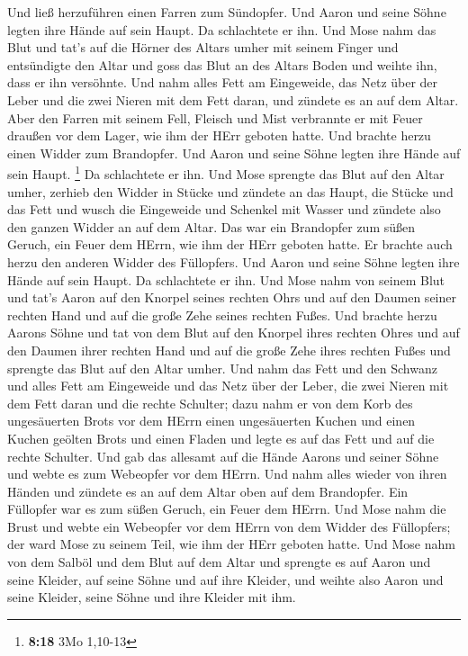  Und ließ herzuführen einen Farren zum Sündopfer. Und Aaron
und seine Söhne legten ihre Hände auf sein Haupt.  Da
schlachtete er ihn. Und Mose nahm das Blut und tat's auf die Hörner des
Altars umher mit seinem Finger und entsündigte den Altar und goss das
Blut an des Altars Boden und weihte ihn, dass er ihn versöhnte.
 Und nahm alles Fett am Eingeweide, das Netz über der Leber
und die zwei Nieren mit dem Fett daran, und zündete es an auf dem Altar.
 Aber den Farren mit seinem Fell, Fleisch und Mist
verbrannte er mit Feuer draußen vor dem Lager, wie ihm der HErr geboten
hatte.  Und brachte herzu einen Widder zum Brandopfer. Und
Aaron und seine Söhne legten ihre Hände auf sein Haupt. \footnote{\textbf{8:18}
  3Mo 1,10-13}  Da schlachtete er ihn. Und Mose sprengte
das Blut auf den Altar umher,  zerhieb den Widder in Stücke
und zündete an das Haupt, die Stücke und das Fett  und
wusch die Eingeweide und Schenkel mit Wasser und zündete also den ganzen
Widder an auf dem Altar. Das war ein Brandopfer zum süßen Geruch, ein
Feuer dem HErrn, wie ihm der HErr geboten hatte.  Er
brachte auch herzu den anderen Widder des Füllopfers. Und Aaron und
seine Söhne legten ihre Hände auf sein Haupt.  Da
schlachtete er ihn. Und Mose nahm von seinem Blut und tat's Aaron auf
den Knorpel seines rechten Ohrs und auf den Daumen seiner rechten Hand
und auf die große Zehe seines rechten Fußes.  Und brachte
herzu Aarons Söhne und tat von dem Blut auf den Knorpel ihres rechten
Ohres und auf den Daumen ihrer rechten Hand und auf die große Zehe ihres
rechten Fußes und sprengte das Blut auf den Altar umher. 
Und nahm das Fett und den Schwanz und alles Fett am Eingeweide und das
Netz über der Leber, die zwei Nieren mit dem Fett daran und die rechte
Schulter;  dazu nahm er von dem Korb des ungesäuerten Brots
vor dem HErrn einen ungesäuerten Kuchen und einen Kuchen geölten Brots
und einen Fladen und legte es auf das Fett und auf die rechte Schulter.
 Und gab das allesamt auf die Hände Aarons und seiner Söhne
und webte es zum Webeopfer vor dem HErrn.  Und nahm alles
wieder von ihren Händen und zündete es an auf dem Altar oben auf dem
Brandopfer. Ein Füllopfer war es zum süßen Geruch, ein Feuer dem HErrn.
 Und Mose nahm die Brust und webte ein Webeopfer vor dem
HErrn von dem Widder des Füllopfers; der ward Mose zu seinem Teil, wie
ihm der HErr geboten hatte.  Und Mose nahm von dem Salböl
und dem Blut auf dem Altar und sprengte es auf Aaron und seine Kleider,
auf seine Söhne und auf ihre Kleider, und weihte also Aaron und seine
Kleider, seine Söhne und ihre Kleider mit ihm.

